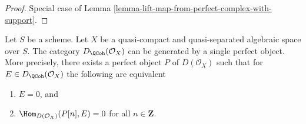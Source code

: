 \begin{proof}
Special case of Lemma \ref{lemma-lift-map-from-perfect-complex-with-support}.
\end{proof}

\begin{theorem}
\label{theorem-bondal-van-den-Bergh}
Let $S$ be a scheme. Let $X$ be a quasi-compact and quasi-separated
algebraic space over $S$. The category
$D_\QCoh(\mathcal{O}_X)$ can be generated by a single
perfect object. More precisely, there exists a perfect object
$P$ of $D(\mathcal{O}_X)$ such that for 
$E \in D_\QCoh(\mathcal{O}_X)$ the following are equivalent
\begin{enumerate}
\item $E = 0$, and
\item $\Hom_{D(\mathcal{O}_X)}(P[n], E) = 0$ for all $n \in \mathbf{Z}$.
\end{enumerate}
\end{theorem}

